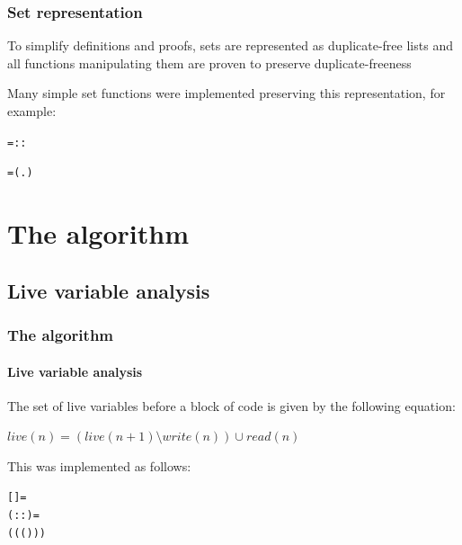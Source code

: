 \documentclass{beamer}
\begin{document}
\begin{frame}[containsverbatim]
\frametitle{Set representation}
To simplify definitions and proofs, sets are represented as duplicate-free lists and all functions manipulating them are proven to preserve duplicate-freeness

Many simple set functions were implemented preserving this representation, for example:

\begin{alltt}\small
	   =        ::
\end{alltt}

\begin{alltt}\small
	   =  (\HOLTokenLambda{}.  \HOLTokenNotEqual{} ) 
\end{alltt}
\end{frame}

\section{The algorithm}
\subsection{Live variable analysis}

\begin{frame}[containsverbatim]
\frametitle{The algorithm}
\framesubtitle{Live variable analysis}
The set of live variables before a block of code is given by the following equation:

\begin{center}
$live(n) = \left(live(n+1) \setminus write(n)\right) \cup read(n)$
\end{center}

This was implemented as follows:

\begin{alltt}\small
	  = 
 (   ::)  =
  (  (  (  )))
\end{alltt}
\end{frame}
\end{document}
